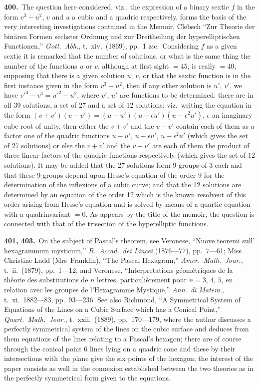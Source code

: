\documentclass[11pt,a4paper]{article}
\theoremstyle{plain}
\theoremstyle{definition}
\theoremstyle{remark}
\begin{document}
\noindent\textbf{400.}\ The question here considered, viz., the expression of a binary sextic $f$ in the form $v^3-u^2$, $v$ and $u$ a cubic and a quadric respectively, forms the basis of the very interesting investigations contained in the Memoir, Clebsch ``Zur Theorie der bin\"{a}ren Formen sechster Ordnung und zur Dreitheilung der hyperelliptischen Functionen,'' \textit{Gott.\ Abh.}, t.~xiv.\ (1869), pp.~1 \&c.\ Considering $f$ as a given sextic it is remarked that the number of solutions, or what is the same thing the number of the functions $u$ or $v$, although at first sight $=45$, is really $=40$; supposing that there is a given solution $u$, $v$, or that the sextic function is in the first instance given in the form $v^3-u^2$, then if any other solution is $u'$, $v'$, we have $v'^3-v^3=u'^2-u^2$, where $v'$, $u'$ are functions to be determined: there are in all 39 solutions, a set of 27 and a set of 12 solutions: viz.\ writing the equation in the form $(v+v')(v-v')=(u-u')(u-\epsilon u')(u-\epsilon^2 u')$, $\epsilon$ an imaginary cube root of unity, then either the $v+v'$ and the $v-v'$ contain each of them as a factor one of the quadric functions $u-u'$, $u-\epsilon u'$, $u-\epsilon^2 u'$ (which gives the set of 27 solutions) or else the $v+v'$ and the $v-v'$ are each of them the product of three linear factors of the quadric functions respectively (which gives the set of 12 solutions). It may be added that the 27 solutions form 9 groups of 3 each and that these 9 groups depend upon Hesse's equation of the order 9 for the determination of the inflexions of a cubic curve; and that the 12 solutions are determined by an equation of the order 12 which is the known resolvent of this order arising from Hesse's equation and is solved by means of a quartic equation with a quadrinvariant $=0$. As appears by the title of the memoir, the question is connected with that of the trisection of the hyperelliptic functions.

\newpage
\setcounter{page}{622}

\smallskip

\noindent\textbf{401, 403.}\ On the subject of Pascal's theorem, see Veronese, ``Nuove teoremi sull' hexagrammum mysticum,'' \textit{R.\ Accad.\ dei Lincei} (1876---77), pp.~7---61; Miss Christine Ladd (Mrs~Franklin), ``The Pascal Hexagram,'' \textit{Amer.\ Math.\ Jour.}, t.~ii.\ (1879), pp.~1---12, and Veronese, ``Interpretations g\'{e}om\'{e}triques de la th\'{e}orie des substitutions de $n$ lettres, particuli\`{e}rement pour $n=3$, $4$, $5$, en relation avec les groupes de l'Hexagramme Mystique,'' \textit{Ann.\ di Matem.}, t.~xi.\ 1882---83, pp.~93---236. See also Richmond, ``A Symmetrical System of Equations of the Lines on a Cubic Surface which has a Conical Point,'' \textit{Quart.\ Math.\ Jour.}, t.~xxii.\ (1889), pp.~170---179, where the author discusses a perfectly symmetrical system of the lines on the cubic surface and deduces from them equations of the lines relating to a Pascal's hexagon; there are of course through the conical point 6 lines lying on a quadric cone and these by their intersections with the plane give the six points of the hexagon; the interest of the paper consists as well in the connexion established between the two theories as in the perfectly symmetrical form given to the equations.
\end{document}
